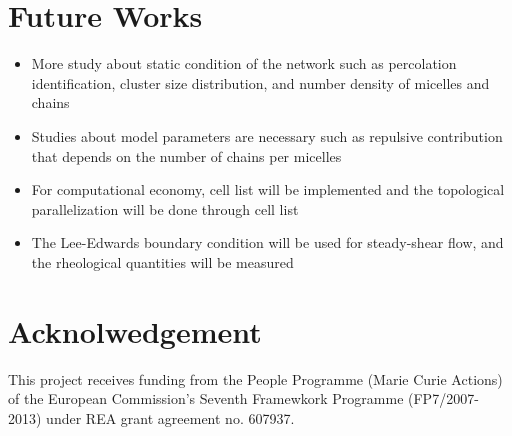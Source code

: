 \documentclass[10pt, a4paper]{article}
\begin{document}
\section{Future Works}
\begin{itemize}
\item More study about static condition of the network such as percolation identification, cluster size distribution, and number density of micelles and chains
\item Studies about model parameters are necessary such as repulsive contribution that depends on the number of chains per micelles
\item For computational economy, cell list will be implemented and the topological parallelization will be done through cell list
\item The Lee-Edwards boundary condition will be used for steady-shear flow, and the rheological quantities will be measured
\end{itemize}

  
\section{Acknolwedgement}
This project receives funding from the People Programme (Marie Curie Actions) of the European Commission's Seventh Framewkork Programme (FP7/2007-2013) under REA grant agreement no. 607937.
\end{document}

